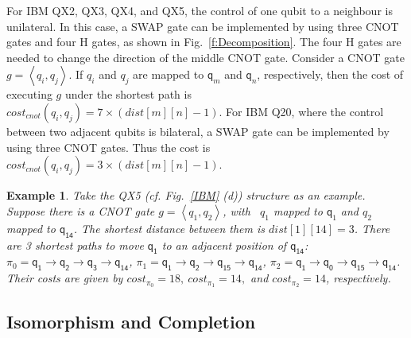 \documentclass[journal]{IEEEtran}
\newtheorem{example}{Example}
\begin{document}
For IBM QX2, QX3, QX4, and QX5, the control of one qubit to a neighbour is unilateral. In this case, 
a SWAP gate can be implemented by using three CNOT gates and four H gates, as shown in Fig.~\ref{f:Decomposition}. The four H gates are needed to change the direction of the middle CNOT gate. 
Consider a CNOT gate $g=\left \langle  \textit{q}_\textit{i},\textit{q}_\textit{j} \right \rangle $. If $q_i$ and $q_j$  are mapped to $\textsf{q}_{m}$ and $\textsf{q}_{n}$, respectively, then the cost of executing $g$ under the shortest path is $cost_{cnot}(\textit{q}_\textit{i},\textit{q}_\textit{j})=7 \times( dist[m][n]-1)$. For IBM Q20, where the control between two adjacent qubits is bilateral, a SWAP gate can be implemented by using three CNOT gates. Thus the cost  is $cost_{cnot}(\textit{q}_\textit{i},\textit{q}_\textit{j})=3 \times( dist[m][n]-1)$. 
\begin{example}
	Take the QX5 (cf. Fig.~\ref{IBM} (d))    structure  as an example. Suppose there is a CNOT gate $g=\left \langle  \textit{q}_\textit{1}, \textit{q}_\textit{2} \right \rangle $, with \ $\textit{q}_\textit{1}$ mapped to $\textsf{q}_{1}$ and $\textit{q}_\textit{2}$ mapped to $\textsf{q}_{\textsf{14}}$. The shortest distance between them  is $dist[1][14]=3$. There are 3 shortest paths to move $\textsf{q}_{\textsf{1}}$ to an adjacent position of 
$\textsf{q}_{\textsf{14}}$:
$\pi_{0}={\textsf{q}_{\textsf{1}}\rightarrow \textsf{q}_{\textsf{2}} \rightarrow \textsf{q}_{\textsf{3}} \rightarrow \textsf{q}_{\textsf{14}}}$,
$\pi_{1}={\textsf{q}_{\textsf{1}}\rightarrow \textsf{q}_{\textsf{2}} \rightarrow \textsf{q}_{\textsf{15}} \rightarrow \textsf{q}_{\textsf{14}}}$,
$\pi_{2}={\textsf{q}_{\textsf{1}}\rightarrow \textsf{q}_{\textsf{0}} \rightarrow \textsf{q}_{\textsf{15}} \rightarrow \textsf{q}_{\textsf{14}}}$.
Their costs are given by 
$cost_{\pi_{0}}=18,\ cost_{\pi_{1}}=14,$ and $ cost_{\pi_{2}}=14$, respectively.
\end{example}



\subsection{Isomorphism and Completion}
\end{document}
